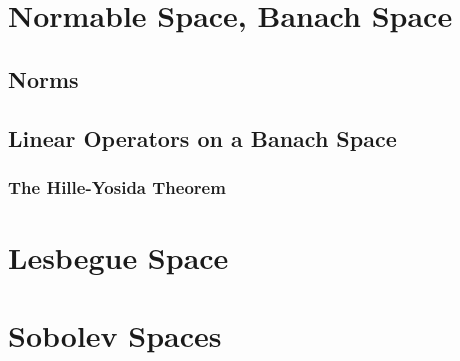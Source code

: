 \documentclass[Total.tex]{subfiles}
\begin{document}
	\chapter{Normable Space, Banach Space}
		\section{Norms}
		\section{Linear Operators on a Banach Space}
			\subsection{The Hille-Yosida Theorem}
	\chapter{Lesbegue Space}
	\chapter{Sobolev Spaces}
	
\end{document}
